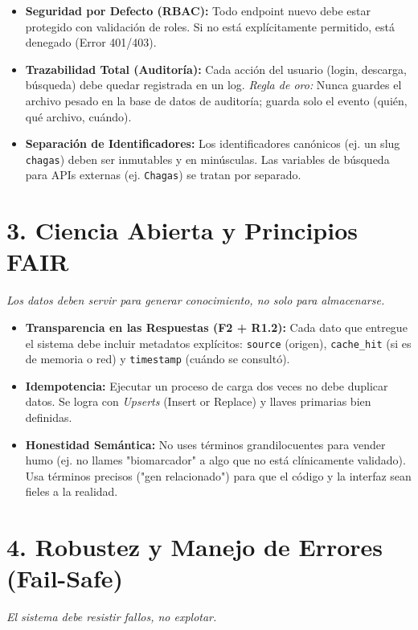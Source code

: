 \documentclass[11pt, a4paper]{article}
\begin{document}
	\begin{itemize}
		\item \textbf{Seguridad por Defecto (RBAC):} Todo endpoint nuevo debe estar protegido con validación de roles. Si no está explícitamente permitido, está denegado (Error 401/403).
		\item \textbf{Trazabilidad Total (Auditoría):} Cada acción del usuario (login, descarga, búsqueda) debe quedar registrada en un log. \textit{Regla de oro:} Nunca guardes el archivo pesado en la base de datos de auditoría; guarda solo el evento (quién, qué archivo, cuándo).
		\item \textbf{Separación de Identificadores:} Los identificadores canónicos (ej. un slug \texttt{chagas}) deben ser inmutables y en minúsculas. Las variables de búsqueda para APIs externas (ej. \texttt{Chagas}) se tratan por separado.
	\end{itemize}
	
	\section*{\color{primary} 3. Ciencia Abierta y Principios FAIR}
	\textit{\color{secondary} Los datos deben servir para generar conocimiento, no solo para almacenarse.}
	
	\begin{itemize}
		\item \textbf{Transparencia en las Respuestas (F2 + R1.2):} Cada dato que entregue el sistema debe incluir metadatos explícitos: \texttt{source} (origen), \texttt{cache\_hit} (si es de memoria o red) y \texttt{timestamp} (cuándo se consultó).
		\item \textbf{Idempotencia:} Ejecutar un proceso de carga dos veces no debe duplicar datos. Se logra con \textit{Upserts} (Insert or Replace) y llaves primarias bien definidas.
		\item \textbf{Honestidad Semántica:} No uses términos grandilocuentes para vender humo (ej. no llames "biomarcador" a algo que no está clínicamente validado). Usa términos precisos ("gen relacionado") para que el código y la interfaz sean fieles a la realidad.
	\end{itemize}
	
	\section*{\color{primary} 4. Robustez y Manejo de Errores (Fail-Safe)}
	\textit{\color{secondary} El sistema debe resistir fallos, no explotar.}
	
\end{document}
